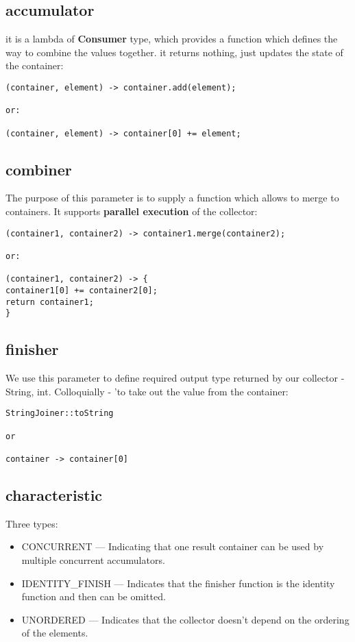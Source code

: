 \documentclass{report}
\begin{document}
\subsection{accumulator}                             
it is a lambda of \textbf{Consumer} type, which provides a function which defines the way to combine the values together.
it returns nothing, just updates the state of the container:
\begin{verbatim}
(container, element) -> container.add(element);

or:

(container, element) -> container[0] += element;
\end{verbatim}


\subsection{combiner}
The purpose of this parameter is to supply a function which allows to merge to containers. It supports
\textbf{parallel execution} of the collector:
\begin{verbatim}
(container1, container2) -> container1.merge(container2); 

or:

(container1, container2) -> { 
container1[0] += container2[0];
return container1;
}
\end{verbatim}

\subsection{finisher}
We use this parameter to define required output type returned by our collector - String, int. Colloquially
- 'to take out the value from the container:
\begin{verbatim}
StringJoiner::toString

or

container -> container[0]
\end{verbatim}

\subsection{characteristic}
Three types:
\begin{itemize}
	\item CONCURRENT — Indicating that one result container can be used by multiple concurrent accumulators.
	\item IDENTITY\_FINISH — Indicates that the finisher function is the identity function and then can be omitted.
	\item UNORDERED — Indicates that the collector doesn’t depend on the ordering of the elements.
\end{itemize}
\end{document}
